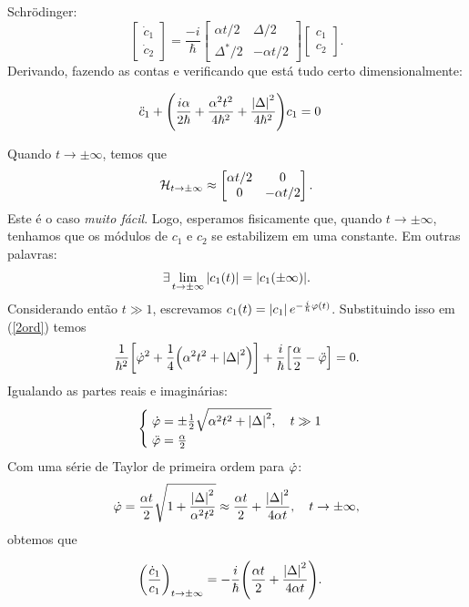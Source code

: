 \documentclass[a4paper,fleqn,12pt]{article}
\begin{document}
Schrödinger:
$$
\begin{bmatrix}
\dot{c}_1 \\ \dot{c}_2
\end{bmatrix}
= \frac{-i}{\hbar}
\begin{bmatrix}
\alpha t/2 & \Delta/2 \\
\Delta^*/2 & -\alpha t/2
\end{bmatrix}
\begin{bmatrix}
c_1 \\ c_2
\end{bmatrix}.
$$
Derivando, fazendo as contas e verificando que está tudo certo dimensionalmente:
\begin{ceqn}
\begin{align} \label{2ord}
\ddot{c}_1 + \qty(\frac{i\alpha}{2\hbar}+\frac{\alpha^2 t^2}{4\hbar^2}+\frac{\abs{\Delta}^2}{4\hbar^2})c_1 & = 0
\end{align}
\end{ceqn}
Quando $t \to \pm \infty$, temos que
$$
\mathcal{H}_{t \to \pm \infty} \approx
\begin{bmatrix}
\alpha t/2 & 0 \\
0 & -\alpha t/2
\end{bmatrix}.
$$
Este é o caso \textit{muito fácil}. Logo, esperamos fisicamente que, quando $t \to \pm \infty$, tenhamos que os módulos de $c_1$ e $c_2$ se estabilizem em uma constante. Em outras palavras:
$$
\exists \, \displaystyle{ \lim_{t \to \pm \infty} \abs{c_1(t)} = \abs{ c_1(\pm \infty)}}.
$$
Considerando então $t \gg 1$, escrevamos $c_1(t) = \abs{c_1} \, e^{-\frac{i}
{\hbar} \varphi(t)}$. Substituindo isso em (\ref{2ord}) temos
$$
\frac{1}{\hbar^2}\qty[\dot{\varphi}^2 + \frac{1}{4}\qty(\alpha^2t^2 + \abs{\Delta}^2)] +
\frac{i}{\hbar}\qty[\frac{\alpha}{2} - \ddot{\varphi}] = 0.
$$
Igualando as partes reais e imaginárias:
$$
\begin{cases}
\; \dot{\varphi} = \pm \frac{1}{2} \sqrt{\alpha^2t^2 + \abs{\Delta}^2}, \quad t \gg 1 \\
\; \ddot{\varphi} = \frac{\alpha}{2}
\end{cases}
$$
Com uma série de Taylor de primeira ordem para $\dot{\varphi}$:
$$
\dot{\varphi} = \frac{\alpha t}{2} \sqrt{1 + \frac{\abs{\Delta}^2}{\alpha^2t^2}} \approx
\frac{\alpha t}{2} + \frac{\abs{\Delta}^2}{4 \alpha t}, \quad t \to \pm \infty,
$$
obtemos que
\begin{ceqn}
\begin{align} \label{toinf}
\qty(\frac{\dot{c}_1}{c_1})_{t \to \pm \infty} &= -\frac{i}{\hbar} \qty(\frac{\alpha t}{2} + \frac{\abs{\Delta}^2}{4\alpha t}).
\end{align}
\end{ceqn}
\end{document}
